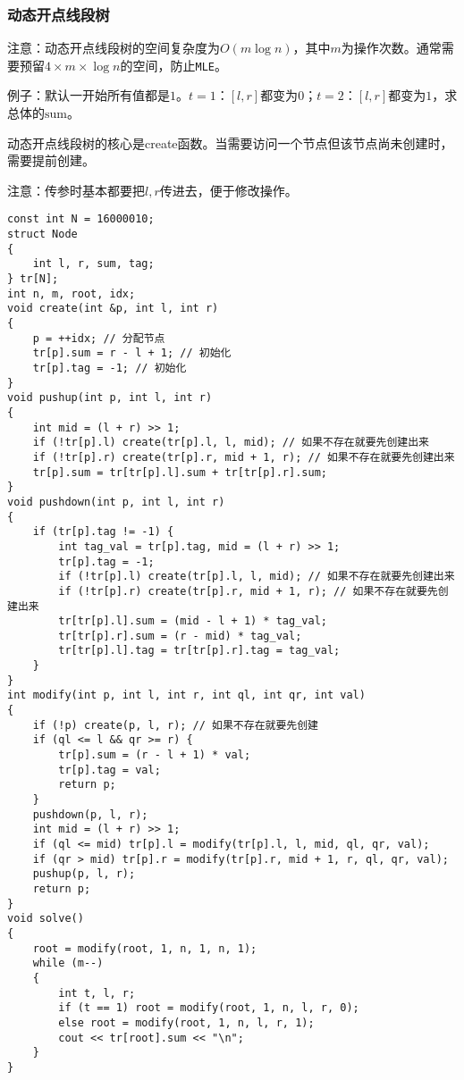 \documentclass[a4paper, fontset=none]{ctexart}
\begin{document}
\subsubsection{动态开点线段树}
注意：动态开点线段树的空间复杂度为$O(m\log n)$，其中$m$为操作次数。通常需要预留$4 \times m \times \log n$的空间，防止\texttt{MLE}。

例子：默认一开始所有值都是$1$。$t=1$：$[l, r]$都变为$0$；$t=2$：$[l, r]$都变为$1$，求总体的$\text{sum}$。

动态开点线段树的核心是create函数。当需要访问一个节点但该节点尚未创建时，需要提前创建。

注意：传参时基本都要把$l, r$传进去，便于修改操作。

\begin{verbatim}
const int N = 16000010;
struct Node
{
    int l, r, sum, tag;
} tr[N];
int n, m, root, idx;
void create(int &p, int l, int r)
{
    p = ++idx; // 分配节点
    tr[p].sum = r - l + 1; // 初始化
    tr[p].tag = -1; // 初始化
}
void pushup(int p, int l, int r)
{
    int mid = (l + r) >> 1;
    if (!tr[p].l) create(tr[p].l, l, mid); // 如果不存在就要先创建出来
    if (!tr[p].r) create(tr[p].r, mid + 1, r); // 如果不存在就要先创建出来
    tr[p].sum = tr[tr[p].l].sum + tr[tr[p].r].sum;
}
void pushdown(int p, int l, int r)
{
    if (tr[p].tag != -1) {
        int tag_val = tr[p].tag, mid = (l + r) >> 1;
        tr[p].tag = -1;
        if (!tr[p].l) create(tr[p].l, l, mid); // 如果不存在就要先创建出来
        if (!tr[p].r) create(tr[p].r, mid + 1, r); // 如果不存在就要先创建出来
        tr[tr[p].l].sum = (mid - l + 1) * tag_val;
        tr[tr[p].r].sum = (r - mid) * tag_val;
        tr[tr[p].l].tag = tr[tr[p].r].tag = tag_val;
    }
}
int modify(int p, int l, int r, int ql, int qr, int val)
{
    if (!p) create(p, l, r); // 如果不存在就要先创建
    if (ql <= l && qr >= r) {
        tr[p].sum = (r - l + 1) * val;
        tr[p].tag = val;
        return p;
    }
    pushdown(p, l, r);
    int mid = (l + r) >> 1;
    if (ql <= mid) tr[p].l = modify(tr[p].l, l, mid, ql, qr, val);
    if (qr > mid) tr[p].r = modify(tr[p].r, mid + 1, r, ql, qr, val);
    pushup(p, l, r);
    return p;
}
void solve()
{
    root = modify(root, 1, n, 1, n, 1);
    while (m--)
    {
        int t, l, r;
        if (t == 1) root = modify(root, 1, n, l, r, 0);
        else root = modify(root, 1, n, l, r, 1);
        cout << tr[root].sum << "\n";
    }
}
\end{verbatim}
\end{document}
